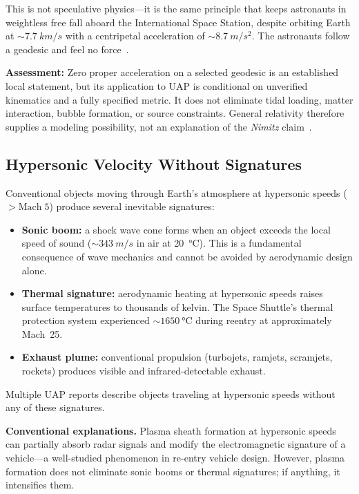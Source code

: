 \documentclass[aps,prd,twocolumn,superscriptaddress,nofootinbib,floatfix]{revtex4-2}
\begin{document}
This is not speculative physics---it is the same principle that keeps astronauts
in weightless free fall aboard the International Space Station, despite orbiting
Earth at ${\sim}\SI{7.7}{km/s}$ with a centripetal acceleration of
${\sim}\SI{8.7}{m/s^{2}}$. The astronauts follow a geodesic and feel no
force~\cite{MTW1973,Wald1984}.

\textbf{Assessment:} Zero proper acceleration on a selected geodesic is an
established local statement, but its application to UAP is conditional on
unverified kinematics and a fully specified metric. It does not eliminate tidal
loading, matter interaction, bubble formation, or source constraints. General
relativity therefore supplies a modeling possibility, not an explanation of the
\textit{Nimitz} claim~\cite{Touboul2022,MTW1973,Wald1984,Knuth2019}.

\subsection{Hypersonic Velocity Without Signatures}\label{sec:hypersonic}

Conventional objects moving through Earth's atmosphere at hypersonic speeds
($>\text{Mach}\;5$) produce several inevitable signatures:
\begin{itemize}
  \item \textbf{Sonic boom:} a shock wave cone forms when an object exceeds the
        local speed of sound (${\sim}\SI{343}{m/s}$ in air at \SI{20}{\celsius}). This is a
        fundamental consequence of wave mechanics and cannot be avoided by
        aerodynamic design alone.
  \item \textbf{Thermal signature:} aerodynamic heating at hypersonic speeds
        raises surface temperatures to thousands of kelvin. The Space Shuttle's
        thermal protection system experienced ${\sim}\SI{1650}{\degreeCelsius}$
        during reentry at approximately Mach~25.
  \item \textbf{Exhaust plume:} conventional propulsion (turbojets, ramjets,
        scramjets, rockets) produces visible and infrared-detectable exhaust.
\end{itemize}
Multiple UAP reports describe objects traveling at hypersonic speeds without any
of these signatures.

\textbf{Conventional explanations.} Plasma sheath formation at hypersonic speeds
can partially absorb radar signals and modify the electromagnetic signature of a
vehicle---a well-studied phenomenon in re-entry vehicle design. However, plasma
formation does not eliminate sonic booms or thermal signatures; if anything, it
intensifies them.
\end{document}
